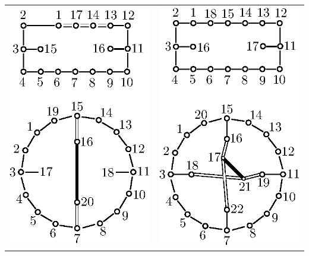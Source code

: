 \begin{landscape}
{\begin{longtable}{@{}ll@{}}
{\includegraphics[scale=0.85]{346.eps}} & {\includegraphics[scale=0.85]{347a.eps}}\\

\end{longtable}}
\end{landscape}
